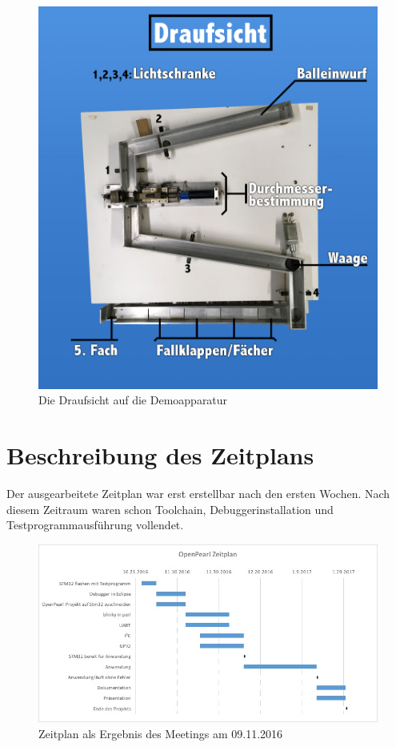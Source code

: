 \begin{figure}[h]
\begin{center}
\includegraphics[width=12cm]{grafiken/Draufsicht.jpg}
\caption{Die Draufsicht auf die Demoapparatur}
\label{draufsicht_sortiermaschine}
\end{center}
\end{figure}

\section{Beschreibung des Zeitplans}
Der ausgearbeitete Zeitplan war erst erstellbar nach den ersten Wochen. Nach diesem Zeitraum waren schon Toolchain, Debuggerinstallation und Testprogrammausführung vollendet. 
\begin{figure}[h]
\begin{center}
\includegraphics[width=13.5cm]{grafiken/zeitplan.jpg}
\caption{Zeitplan als Ergebnis des Meetings am 09.11.2016}
\label{zeitplan}
\end{center}
\end{figure}

